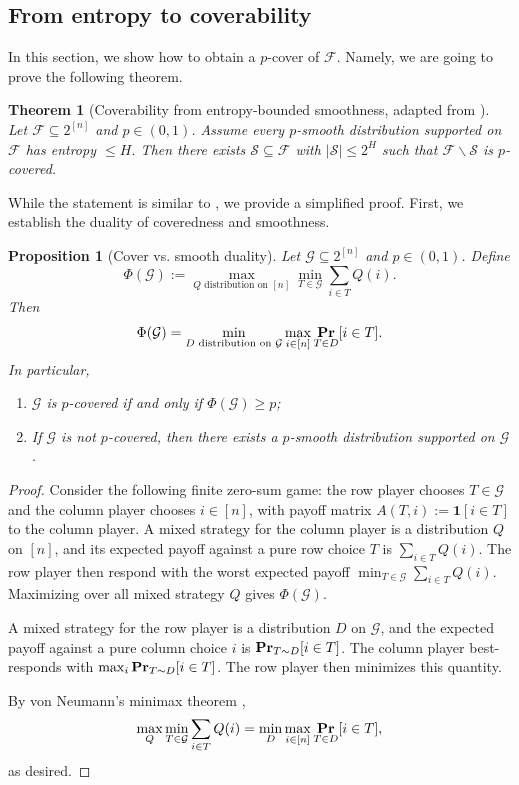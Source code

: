 \documentclass{article}
\newtheorem{theorem}{Theorem}[section]
\newtheorem{proposition}[proposition]{Proposition}
\renewcommand{\Pr}{\mathop{\bf Pr\/}}
\newcommand{\<}{\langle}
\renewcommand{\>}{\rangle}
\newcommand{\calF}{\mathcal{F}}
\newcommand{\calG}{\mathcal{G}}
\newcommand{\calS}{\mathcal{S}}
\begin{document}
\subsection{From entropy to coverability}\label{subsec:entropy_to_cover}
In this section, we show how to obtain a $p$-cover of $\calF$. Namely, we are going to prove the following theorem. 
\begin{theorem}[Coverability from entropy-bounded smoothness, adapted from {\cite[Lemma~4.15]{BG25}}]
\label{thm:coverability_from_smoothness}
    Let $\calF \subseteq 2^{[n]}$ and $p \in (0, 1)$. Assume every $p$-smooth distribution supported on $\calF$ has entropy $\leq H$. Then there exists $\calS \subseteq \calF$ with $|\calS| \leq 2^H$ such that $\calF \backslash \calS$ is $p$-covered.
\end{theorem}

While the statement is similar to \cite[Lemma 4.15]{BG25}, we provide a simplified proof. First, we establish the duality of coveredness and smoothness.

\begin{proposition}[Cover vs. smooth duality]\label{prop:minimax_smooth_cover}
    Let $\calG \subseteq 2^{[n]}$ and $p \in (0, 1)$. Define
    \[
    \Phi (\calG) := \max_{Q \text{ distribution on }[n]} \min_{T \in \calG} \sum_{i \in T}Q(i).
    \]
    Then 
    \[
    \Phi (\calG) = \min_{D \text{ distribution on }\calG} \max_{i \in [n]} \Pr_{T \in D}[i \in T].
    \]
    In particular,
    \begin{enumerate}
        \item $\calG$ is $p$-covered if and only if $\Phi (\calG) \geq p$;
        \item If $\calG$ is not $p$-covered, then there exists a $p$-smooth distribution supported on $\calG$.
    \end{enumerate}
\end{proposition}

\begin{proof}
    Consider the following finite zero-sum game: the row player chooses $T \in \calG$ and the column player chooses $i \in [n]$, with payoff matrix $A(T, i):= \mathbf{1}[i \in T]$ to the column player. A mixed strategy for the column player is a distribution $Q$ on $[n]$, and its expected payoff against a pure row choice $T$ is $\sum_{i \in T}Q(i)$. The row player then respond with the worst expected payoff $\min_{T \in \calG} \sum_{i \in T}Q(i)$. Maximizing over all mixed strategy $Q$ gives $\Phi (\calG)$.

    A mixed strategy for the row player is a distribution $D$ on $\calG$, and the expected payoff against a pure column choice $i$ is $\Pr_{T \sim D}[i \in T]$. The column player best-responds with $\max_i \Pr_{T \sim D}[i \in T]$. The row player then minimizes this quantity.

    By von Neumann's minimax theorem \cite{Neu28},
    \[
    \max_{Q} \min_{T \in \calG} \sum_{i \in T}Q(i) = \min_{D} \max_{i \in [n]} \Pr_{T \in D}[i \in T],
    \]
    as desired. 
\end{proof}
\end{document}
